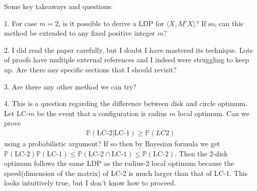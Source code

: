 \documentclass[10pt]{article}
\newcommand{\p}{\mathbb{P}}
\newenvironment{Proof of lemma}{\noindent{\bf Proof of Lemma}}{\hfill$\Box$\newline}
\newenvironment{Proof of claim}{\noindent{\bf Proof of claim}}{\hfill$\Box$\newline}
\newenvironment{Proof of theorem}{\noindent{\bf Proof of Theorem}}{\hfill\scriptsize{$\Box$}\newline}
\newenvironment{Proof of theorems}{\noindent{\bf Proof of Theorems}}{\hfill$\Box$\newline}
\newenvironment{Proof of proposition}{\noindent{\bf Proof of Proposition}}{\hfill$\Box$\newline}
\newenvironment{Proof of propositions}{\noindent{\bf Proof of Propositions}}{\hfill$\Box$\newline}
\newenvironment{Proof of exercise}{\noindent{\it Proof of Exercise:}}{\hfill$\Box$}
\begin{document}
Some key takeaways and questions:


1. For case $m=2$, is it possible to derive a LDP for $\langle X, M'X \rangle$? If so, can this method be extended to any fixed positive integer $m$?

2. I did read the paper carefully, but I doubt I have mastered its technique. Lots of proofs have multiple external references and I indeed were struggling to keep up. Are there any specific sections that I should revisit?

3. Are there any other method we can try?

4. This is a question regarding the difference between disk and circle optimum. Let LC-$m$ be the event that a configuration is radius $m$ local optimum. Can we prove
\begin{align}
    \p(\text{LC-2} | \text{LC-1}) \geq \p(LC2)
\end{align}
using a probabilistic argument? If so then by Bayesian formula we get $ \p(\text{LC-2})\p(\text{LC-1}) \leq \p(\text{LC-2} \cap \text{LC-1}) \leq \p(\text{LC-2})$. Then the 2-disk optimum follows the same LDP as the radius-2 local optimum because the speed(dimension of the matrix) of LC-2 is much larger than that of LC-1. This looks intuitively true, but I don't know how to proceed.
\end{document}

